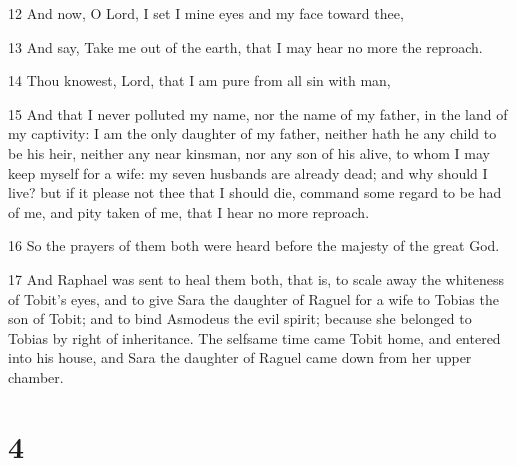 \par 12 And now, O Lord, I set I mine eyes and my face toward thee,
\par 13 And say, Take me out of the earth, that I may hear no more the reproach.
\par 14 Thou knowest, Lord, that I am pure from all sin with man,
\par 15 And that I never polluted my name, nor the name of my father, in the land of my captivity: I am the only daughter of my father, neither hath he any child to be his heir, neither any near kinsman, nor any son of his alive, to whom I may keep myself for a wife: my seven husbands are already dead; and why should I live? but if it please not thee that I should die, command some regard to be had of me, and pity taken of me, that I hear no more reproach.
\par 16 So the prayers of them both were heard before the majesty of the great God.
\par 17 And Raphael was sent to heal them both, that is, to scale away the whiteness of Tobit's eyes, and to give Sara the daughter of Raguel for a wife to Tobias the son of Tobit; and to bind Asmodeus the evil spirit; because she belonged to Tobias by right of inheritance. The selfsame time came Tobit home, and entered into his house, and Sara the daughter of Raguel came down from her upper chamber.

\chapter{4}

